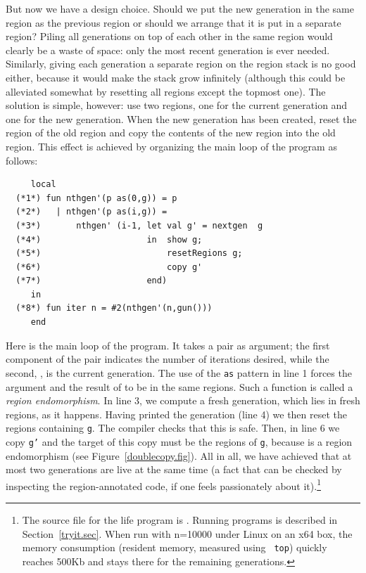 \documentclass[12pt]{book}
\begin{document}
But now we have a design choice. Should we put the new generation in
the same region as the previous region or should we arrange that it is
put in a separate region? Piling all generations on top of each other
in the same region would clearly be a waste of space: only the most
recent generation is ever needed. Similarly, giving each generation a
separate region on the region stack is no good either, because it
would make the stack grow infinitely (although this could be
alleviated somewhat by resetting all regions except the topmost one).
The solution is simple, however: use two regions, one for the current
generation and one for the new generation. When the new generation has
been created, reset the region of the old region and copy the contents
of the new region into the old region. This effect is achieved by
organizing the main loop of the program as follows:
\begin{verbatim}
     local
  (*1*) fun nthgen'(p as(0,g)) = p
  (*2*)   | nthgen'(p as(i,g)) =
  (*3*)       nthgen' (i-1, let val g' = nextgen  g
  (*4*)                     in  show g;
  (*5*)                         resetRegions g;
  (*6*)                         copy g'
  (*7*)                     end)
     in
  (*8*) fun iter n = #2(nthgen'(n,gun()))
     end
\end{verbatim}
Here 
%
is the main loop of the program. It takes a pair as argument; the
first component of the pair indicates the number of iterations
desired, while the second, , is the current generation. The
use of the {\tt as} pattern in line 1 forces the argument and the
result of  to be in the same regions. Such a function
is called a
%
{\em region endomorphism}. In line 3, we compute a fresh generation,
which lies in fresh regions, as it happens. Having printed the
generation (line 4) we then reset the regions containing {\tt g}. The
compiler checks that this is safe. Then, in line 6 we copy {\tt g'}
and the target of this copy must be the regions of {\tt g}, because
 is a region endomorphism (see
Figure~\ref{doublecopy.fig}).  All in all, we have achieved that at
most two generations are live at the same time (a fact that can be
checked by inspecting the region-annotated code, if one feels
passionately about it).\footnote{The source file for the life program
  is . Running programs is described in
  Section~\ref{tryit.sec}. When run with n=10000 under Linux on an x64
  box, the memory consumption (resident memory, measured using {\tt
    top}) quickly reaches 500Kb and
  stays there for the remaining generations.}
\end{document}
